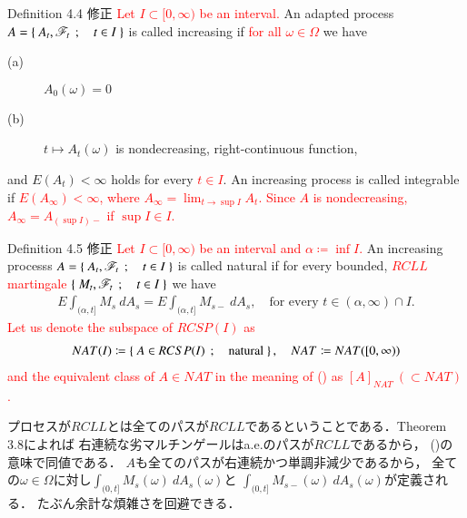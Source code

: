 	\begin{itembox}[l]{Definition 4.4 修正}
		\textcolor{red}{Let $I \subset [0,\infty)$ be an interval.}
		An adapted process \textcolor{red}{$A = \left\{\ A_t,\mathscr{F}_t\ \, ; \quad t \in I\ \right\}$} 
		is called increasing if \textcolor{red}{for all $\omega \in \Omega$} we have
		\begin{description}
			\item[(a)] $A_0(\omega) = 0$
			\item[(b)] $t \longmapsto A_t(\omega)$ is nondecreasing, right-continuous function,
		\end{description}
		and $E(A_t) < \infty$ holds for every \textcolor{red}{$t \in I$}.
		An increasing process is called integrable if \textcolor{red}{$E\left(A_{\infty}\right) < \infty$,
		where $A_{\infty} = \lim_{t \to \sup{}{I}} A_t$.
		Since $A$ is nondecreasing, $A_{\infty} = A_{(\sup{}{I})-}$ if $\sup{}{I} \in I$.}
	\end{itembox}
	
	\begin{itembox}[l]{Definition 4.5 修正}
		\textcolor{red}{Let $I \subset [0,\infty)$ be an interval and $\alpha \coloneqq \inf{}{I}$.}
		An increasing processs \textcolor{red}{$A = \left\{\ A_t,\mathscr{F}_t\ \, ; \quad t \in I\ \right\}$} 
		is called natural if for every bounded, 
		\textcolor{red}{$RCLL$ martingale $\left\{\ M_t,\mathscr{F}_t\ \, ; \quad t \in I\ \right\}$} we have
		\begin{align}
			E \int_{(\alpha,t]} M_s\ dA_s = E \int_{(\alpha,t]} M_{s-}\ dA_s,
			\quad \mbox{for every $t \in (\alpha,\infty) \cap I$}.
		\end{align}
		\textcolor{red}{Let us denote the subspace of $RCSP(I)$ as
		\begin{align}
			NAT(I) \coloneqq
			\left\{\ A \in RCSP(I)\ \, ; \quad \mbox{natural}\ \right\},
			\quad NAT \coloneqq NAT([0,\infty))
		\end{align}
		and the equivalent class of $A \in NAT$
		in the meaning of () as $[A]_{NAT}\ ( \subset NAT)$.}
	\end{itembox}
	
	プロセスが$RCLL$とは全てのパスが$RCLL$であるということである．Theorem 3.8によれば
	右連続な劣マルチンゲールはa.e.のパスが$RCLL$であるから，
	()の意味で同値である．
	$A$も全てのパスが右連続かつ単調非減少であるから，
	全ての$\omega \in \Omega$に対し$\int_{(0,t]} M_s(\omega)\ dA_s(\omega)$と
	$\int_{(0,t]} M_{s-}(\omega)\ dA_s(\omega)$が定義される．
	たぶん余計な煩雑さを回避できる．
		
